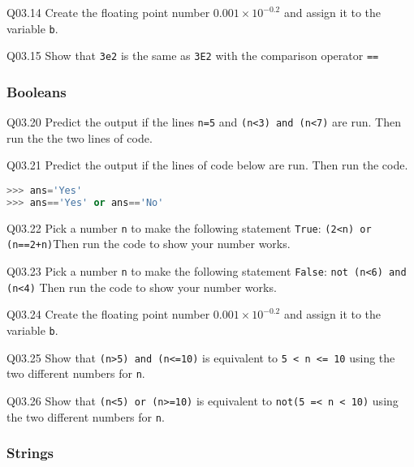 \documentclass{book}
\newcommand{\passthrough}[1]{#1}
\begin{document}
Q03.14 Create the floating point number \(0.001 \times 10^{-0.2}\) and
assign it to the variable \passthrough{\lstinline!b!}.

Q03.15 Show that \passthrough{\lstinline!3e2!} is the same as
\passthrough{\lstinline!3E2!} with the comparison operator
\passthrough{\lstinline!==!}
    




    
        \hypertarget{booleans}{%
\subsubsection{Booleans}\label{booleans}}

Q03.20 Predict the output if the lines \passthrough{\lstinline!n=5!} and
\passthrough{\lstinline!(n<3) and (n<7)!} are run. Then run the the two
lines of code.

Q03.21 Predict the output if the lines of code below are run. Then run
the code.

\begin{lstlisting}[language=Python]
>>> ans='Yes'
>>> ans=='Yes' or ans=='No'
\end{lstlisting}

Q03.22 Pick a number \passthrough{\lstinline!n!} to make the following
statement \passthrough{\lstinline!True!}:
\passthrough{\lstinline!(2<n) or (n==2+n)!}Then run the code to show
your number works.

Q03.23 Pick a number \passthrough{\lstinline!n!} to make the following
statement \passthrough{\lstinline!False!}:
\passthrough{\lstinline!not (n<6) and (n<4)!} Then run the code to show
your number works.

Q03.24 Create the floating point number \(0.001 \times 10^{-0.2}\) and
assign it to the variable \passthrough{\lstinline!b!}.

Q03.25 Show that \passthrough{\lstinline!(n>5) and (n<=10)!} is
equivalent to \passthrough{\lstinline!5 < n <= 10!} using the two
different numbers for \passthrough{\lstinline!n!}.

Q03.26 Show that \passthrough{\lstinline!(n<5) or (n>=10)!} is
equivalent to \passthrough{\lstinline!not(5 =< n < 10)!} using the two
different numbers for \passthrough{\lstinline!n!}.
    




    
        \hypertarget{strings}{%
\subsubsection{Strings}\label{strings}}
\end{document}
